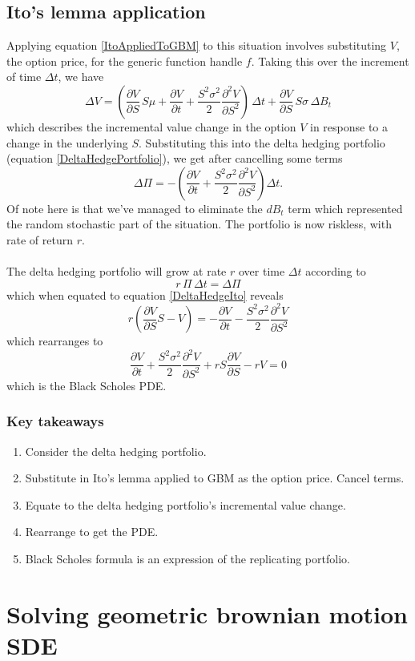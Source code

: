 \documentclass[12pt]{article}
\newcommand{\dpart}[2]{\frac{\partial #1}{\partial #2}}
\begin{document}
\subsection{Ito's lemma application}

Applying equation \ref{ItoAppliedToGBM} to this situation involves substituting $V$, the option price, for the generic function handle $f$. Taking this over the increment of time $\Delta t$, we have
\begin{equation}
	\Delta V=\left(\dpart{V}{S}\,S\mu+\dpart{V}{t}+\frac{S^2\sigma^2}{2}\frac{\partial^2 V}{\partial S^2}\right)\,\Delta t + \dpart{V}{S}\,S\sigma\,\Delta B_t
\end{equation}
which describes the incremental value change in the option $V$ in response to a change in the underlying $S$. Substituting this into the delta hedging portfolio (equation \ref{DeltaHedgePortfolio}), we get after cancelling some terms
\begin{equation}\label{DeltaHedgeIto}
	\Delta\Pi = -\left(\dpart{V}{t}+\frac{S^2\sigma^2}{2}\frac{\partial^2 V}{\partial S^2}\right)\Delta t.
\end{equation}
Of note here is that we've managed to eliminate the $dB_t$ term which represented the random stochastic part of the situation. The portfolio is now riskless, with rate of return $r$.\\
\\
The delta hedging portfolio will grow at rate $r$ over time $\Delta t$ according to
\begin{equation}
	r\,\Pi\,\Delta t = \Delta \Pi
\end{equation}
which when equated to equation \ref{DeltaHedgeIto} reveals
\begin{equation}
	r\left(\dpart{V}{S}S-V\right)=-\dpart{V}{t}-\frac{S^2\sigma^2}{2}\frac{\partial^2 V}{\partial S^2}
\end{equation}
which rearranges to
\begin{equation}
	\dpart{V}{t}+\frac{S^2\sigma^2}{2}\frac{\partial^2 V}{\partial S^2}+rS\dpart{V}{S}-rV=0
\end{equation}
which is the Black Scholes PDE.
\subsubsection{Key takeaways}
\begin{enumerate}
	\item Consider the delta hedging portfolio.
	\item Substitute in Ito's lemma applied to GBM as the option price. Cancel terms.
	\item Equate to the delta hedging portfolio's incremental value change.
	\item Rearrange to get the PDE.
	\item Black Scholes formula is an expression of the replicating portfolio.
\end{enumerate}






\section{Solving geometric brownian motion SDE}
\end{document}

